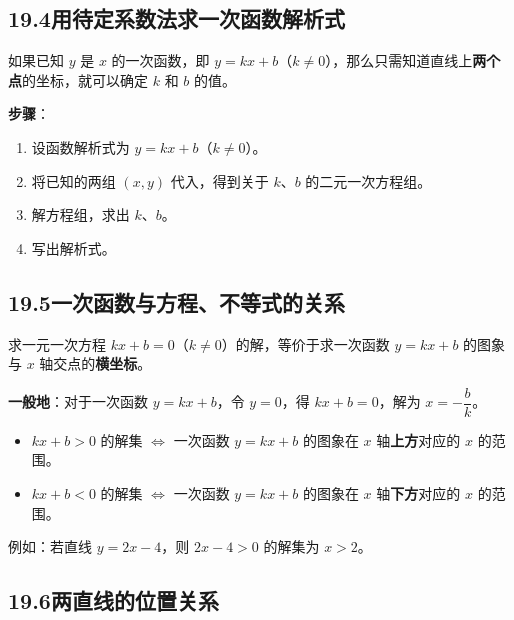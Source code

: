 \documentclass[12pt, a4paper]{ctexart}
\begin{document}
\subsection*{19.4\quad 用待定系数法求一次函数解析式}

\begin{knowledgebox}[待定系数法]
如果已知 $y$ 是 $x$ 的一次函数，即 $y = kx + b$（$k\neq 0$），那么只需知道直线上\textbf{两个点}的坐标，就可以确定 $k$ 和 $b$ 的值。

\textbf{步骤}：
\begin{enumerate}[leftmargin=2em]
  \item 设函数解析式为 $y = kx + b$（$k\neq 0$）。
  \item 将已知的两组 $(x, y)$ 代入，得到关于 $k$、$b$ 的二元一次方程组。
  \item 解方程组，求出 $k$、$b$。
  \item 写出解析式。
\end{enumerate}
\end{knowledgebox}

\subsection*{19.5\quad 一次函数与方程、不等式的关系}

\begin{knowledgebox}[一次函数与一元一次方程]
求一元一次方程 $kx + b = 0$（$k\neq 0$）的解，等价于求一次函数 $y = kx + b$ 的图象与 $x$ 轴交点的\textbf{横坐标}。

\medskip
\textbf{一般地}：对于一次函数 $y = kx + b$，令 $y = 0$，得 $kx + b = 0$，解为 $x = -\dfrac{b}{k}$。
\end{knowledgebox}

\begin{knowledgebox}[一次函数与一元一次不等式]
\begin{itemize}[leftmargin=2em]
  \item $kx + b > 0$ 的解集 $\Longleftrightarrow$ 一次函数 $y = kx + b$ 的图象在 $x$ 轴\textbf{上方}对应的 $x$ 的范围。
  \item $kx + b < 0$ 的解集 $\Longleftrightarrow$ 一次函数 $y = kx + b$ 的图象在 $x$ 轴\textbf{下方}对应的 $x$ 的范围。
\end{itemize}

例如：若直线 $y = 2x - 4$，则 $2x - 4 > 0$ 的解集为 $x > 2$。
\end{knowledgebox}

\subsection*{19.6\quad 两直线的位置关系}
\end{document}
